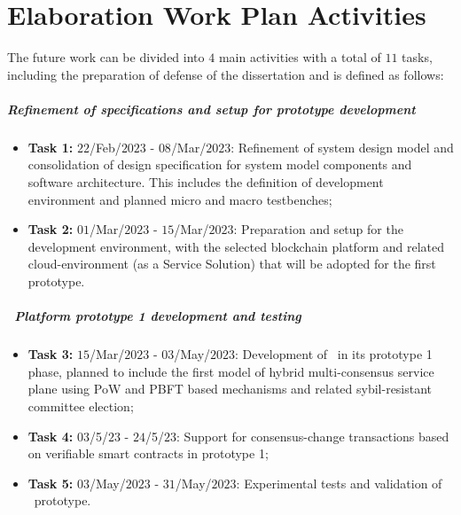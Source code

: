 
%

\chapter{Elaboration Work Plan Activities}
\label{ann:work_plan}

The future work can be divided into $4$ main activities with a total of $11$ tasks, including the preparation of defense of the dissertation and is defined as follows:

\paragraph{Refinement of specifications and setup for prototype development}

\begin{itemize}
    \item \textbf{Task 1:} $22$/Feb/$2023$ - $08$/Mar/$2023$: Refinement of system design model and consolidation of design specification for system model components and software architecture. This includes the definition of development environment and planned micro and macro testbenches;
    
    \item \textbf{Task 2:} $01$/Mar/$2023$ - $15$/Mar/$2023$: Preparation and setup for the development environment, with the selected blockchain platform and related cloud-environment (as a Service Solution) that will be adopted for the first prototype.
\end{itemize}



\paragraph{\mysystem~Platform prototype 1 development and testing}

\begin{itemize}    
    \item \textbf{Task 3:} $15$/Mar/$2023$ - $03$/May/$2023$: Development of \mysystem~in its prototype 1 phase, planned to include the first model of hybrid multi-consensus service plane using \gls{PoW} and \gls{PBFT} based mechanisms and related sybil-resistant committee election;

    \item \textbf{Task 4:} $03$/5/$23$ - $24$/5/$23$: Support for consensus-change transactions based on verifiable smart contracts in prototype 1;

    \item \textbf{Task 5:} $03$/May/$2023$ - $31$/May/$2023$: Experimental tests and validation of \mysystem~prototype.
\end{itemize}



